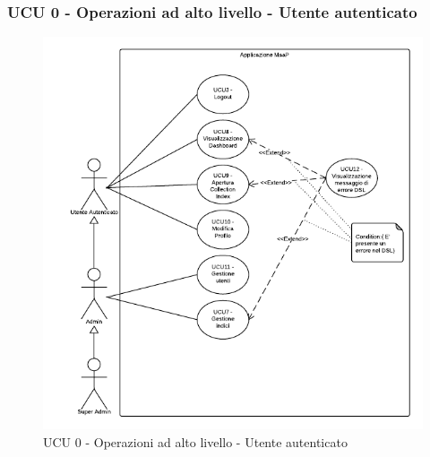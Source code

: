 \subsubsection{UCU 0 - Operazioni ad alto livello - Utente autenticato}    
    \begin{figure}[H]
      \begin{center}
      \includegraphics[width=12cm]{UML/UCU 0 - Operazioni ad alto livello - Utente autenticato.png}
      \caption{UCU 0 - Operazioni ad alto livello - Utente autenticato}
      \end{center} 
    \end{figure}    
    
